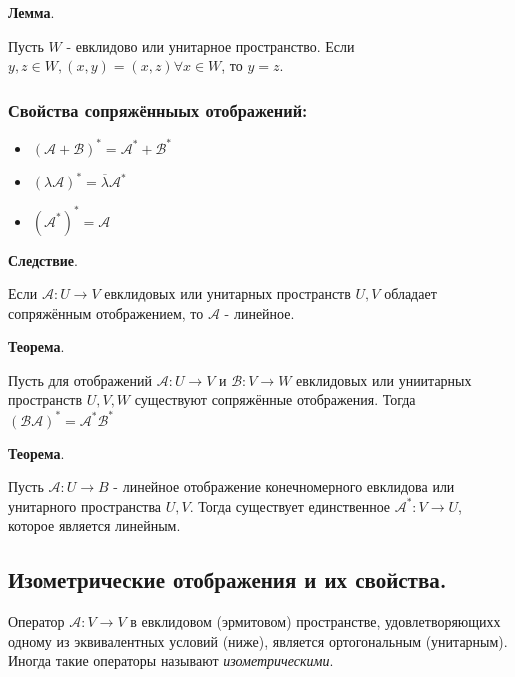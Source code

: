 \documentclass[a4paper]{article}
\begin{document}
\begin{htheorem}\textbf{Лемма}.

Пусть $W$ - евклидово или унитарное пространство. Если $y,z \in W, (x,y) = (x,z) \forall x \in W$, то $y=z$.
\end{htheorem}

\subsubsection*{Свойства сопряжённыых отображений:}
\begin{itemize}
\item $(\mathcal{A} + \mathcal{B})^* = \mathcal{A}^*+\mathcal{B}^*$
\item $(\lambda \mathcal{A})^* = \overline{\lambda} \mathcal{A}^*$
\item $(\mathcal{A}^*)^* = \mathcal{A}$
\end{itemize}


\begin{htheorem}\textbf{Следствие}.

Если $\mathcal{A} : U \rightarrow V$ евклидовых или унитарных пространств $U,V$ обладает сопряжённым отображением, то $\mathcal{A}$ - линейное.

\end{htheorem}

\begin{htheorem}\textbf{Теорема}.

Пусть для отображений $\mathcal{A}: U \rightarrow V$ и $\mathcal{B}: V \rightarrow W$ евклидовых или униитарных пространств $U, V, W$ существуют сопряжённые отображения. Тогда $(\mathcal{B} \mathcal{A})^* = \mathcal{A}^* \mathcal{B}^*$
\end{htheorem}

\begin{htheorem}\textbf{Теорема}.

Пусть $\mathcal{A} : U \rightarrow B$ - линейное отображение конечномерного евклидова или унитарного пространства $U, V$. Тогда существует единственное $\mathcal{A}^*: V \rightarrow U$, которое является линейным.
\end{htheorem}

\subsection*{Изометрические отображения и их свойства.}

Оператор $\mathcal{A} : V \rightarrow V$ в евклидовом (эрмитовом) пространстве, удовлетворяющихх одному из эквивалентных условий (ниже), является ортогональным (унитарным). Иногда такие операторы называют \textit{изометрическими}.
\end{document}
